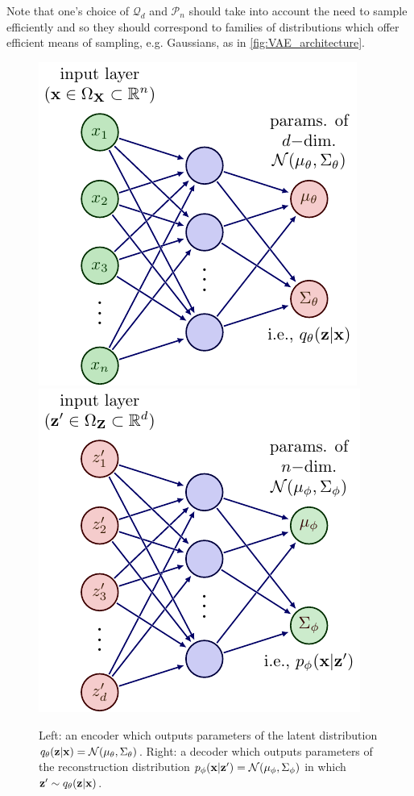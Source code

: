 \documentclass[11pt]{article}
\begin{document}
Note that one's choice of $\mathcal{Q}_d$ and $\mathcal{P}_n$ should take into account the need to sample efficiently and so they should correspond to families of distributions which offer efficient means of sampling, e.g. Gaussians, as in \autoref{fig:VAE_architecture}.

\begin{figure}[t]
    \centering
    \includegraphics[width=0.46\linewidth]{figures/generative_models/VAE_encoder.pdf}
    \hspace{20pt}
    \includegraphics[width=0.46\linewidth]{figures/generative_models/VAE_decoder.pdf}
    \caption{Left: an encoder which outputs parameters of the latent distribution $q_{\theta}(\mathbf{z}|\mathbf{x})=\mathcal{N}(\mu_{\theta},\Sigma_{\theta})$. Right: a decoder which outputs parameters of the reconstruction distribution $p_{\phi}(\mathbf{x}|\mathbf{z}')=\mathcal{N}(\mu_{\phi},\Sigma_{\phi})$ in which $\mathbf{z}'\sim q_{\theta}(\mathbf{z}|\mathbf{x})$.}
    \label{fig:VAE_architecture}
\end{figure}
\end{document}
